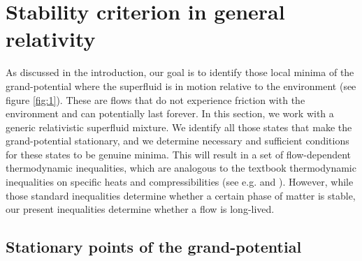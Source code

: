 \documentclass[a4paper, amsfonts, amssymb, amsmath, reprint, showkeys, nofootinbib, twoside,notitlepage,onecolumn]{revtex4-2}
\theoremstyle{definition}
\theoremstyle{theorem}
\theoremstyle{corollary}
\begin{document}
\vspace{-0.3cm}
\section{Stability criterion in general relativity}\label{stabiliycrituzzione}
\vspace{-0.2cm}

As discussed in the introduction, our goal is to identify those local minima of the grand-potential where the superfluid is in motion relative to the environment (see figure \ref{fig:1}). These are flows that do not experience friction with the environment and can potentially last forever. In this section, we work with a generic relativistic superfluid mixture. We identify all those states that make the grand-potential stationary, and we determine necessary and sufficient conditions for these states to be genuine minima. This will result in a set of flow-dependent thermodynamic inequalities, which are analogous to the textbook thermodynamic inequalities on specific heats and compressibilities (see e.g. \cite[\S 21]{landau5} and \cite[\S 12]{prigoginebook}). However, while those standard inequalities determine whether a certain phase of matter is stable, our present inequalities determine whether a flow is long-lived.

\vspace{-0.4cm}
\subsection{Stationary points of the grand-potential}\label{theton}
\vspace{-0.2cm}
\end{document}
